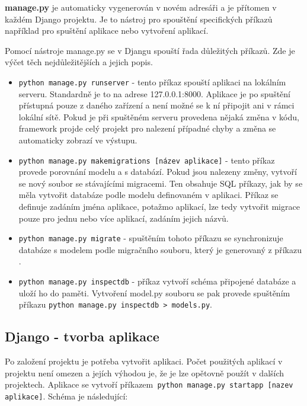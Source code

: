 \textbf{manage.py} je automaticky vygenerován v novém adresáři a je
přítomen v každém Django projektu. Je to nástroj pro spouštění
specifických příkazů například pro spuštění aplikace nebo vytvoření
aplikací.

\newpage

Pomocí nástroje manage.py se v Djangu spouští řada důležitých
příkazů. Zde je výčet těch nejdůležitějších a jejich popis. \cite{django-admin-manage}

\begin{itemize}
\item {\tt python manage.py runserver} \label{runserver}- tento příkaz spouští
  aplikaci na lokálním serveru. Standardně je to na adrese
  127.0.0.1:8000. Aplikace je po spuštění přístupná pouze z daného
  zařízení a není možné se k ní připojit ani v rámci lokální
  sítě. Pokud je při spuštěném serveru provedena nějaká změna v kódu,
  framework projde celý projekt pro nalezení případné chyby a změna se
  automaticky zobrazí ve výstupu.
	
\item {\tt python manage.py makemigrations [název aplikace]} -
  tento příkaz provede porovnání modelu a s databází. Pokud jsou
  nalezeny změny, vytvoří se nový soubor se stávajícími migracemi. Ten
  obsahuje SQL příkazy, jak by se měla vytvořit databáze podle modelu
  definovaném v aplikaci. Příkaz se definuje zadáním jména aplikace,
  potažmo aplikací, lze tedy vytvořit migrace pouze pro jednu nebo
  více aplikací, zadáním jejich názvů.

\item {\tt python manage.py migrate} - spuštěním tohoto příkazu se
  synchronizuje databáze s modelem podle migračního souboru, který je
  generovaný z příkazu .
	
\item {\tt python manage.py inspectdb} - příkaz vytvoří schéma
  připojené databáze a uloží ho do paměti. Vytvoření model.py souboru
  se pak provede spuštěním příkazu {\tt python manage.py inspectdb
    > models.py}.

\end{itemize}

\newpage

\subsection{Django - tvorba aplikace}

Po založení projektu je potřeba vytvořit aplikaci. Počet použitých
aplikací v projektu není omezen a jejích výhodou je, že je lze
opětovně použít v dalších projektech. Aplikace se vytvoří příkazem{\tt
python manage.py startapp [nazev aplikace]}. \cite{django-init} Schéma je následující:

